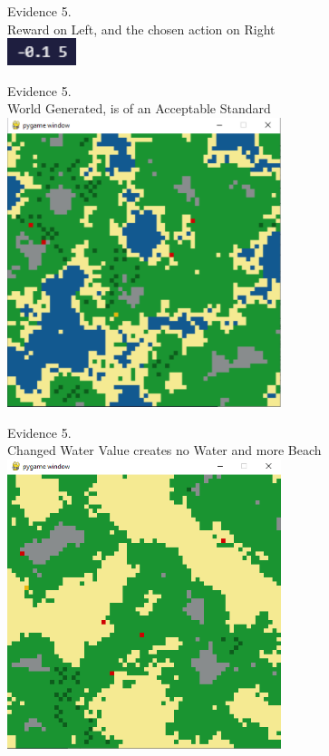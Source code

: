 \begin{center}
    {\large Evidence 5.\rn } \\ 
    \vspace{0.3cm}
    Reward on Left, and the chosen action on Right \\
    \includegraphics[width=2cm]{Images/Testing/T5.6.1.PNG} \\
    \vspace{1cm}

    {\large Evidence 5.\rn } \\ 
    \vspace{0.3cm}
    World Generated, is of an Acceptable Standard \\
    \includegraphics[width=8cm]{Images/Testing/T5.7.1.PNG} \\
    \vspace{1cm}

    {\large Evidence 5.\rn } \\ 
    \vspace{0.3cm}
    Changed Water Value creates no Water and more Beach \\
    \includegraphics[width=8cm]{Images/Testing/T5.8.1.PNG} \\
    \vspace{1cm}


\end{center}
